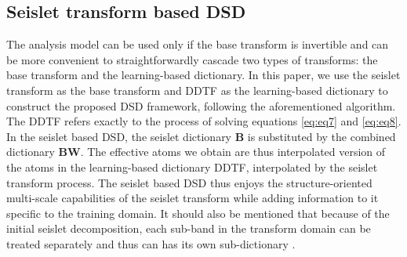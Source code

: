 \subsection{Seislet transform based DSD}
The analysis model can be used only if the base transform is invertible and can be more convenient to straightforwardly cascade two types of transforms: the base transform and the learning-based dictionary. In this paper, we use the seislet transform \cite[]{fomel2010seislet} as the base transform and DDTF \cite[]{jianfeng2013} as the learning-based dictionary to construct the proposed DSD framework, following 
the aforementioned algorithm. The DDTF refers exactly to the process of solving equations \ref{eq:eq7} and \ref{eq:eq8}. In the seislet based DSD, the seislet dictionary $\mathbf{B}$ is substituted by the combined dictionary $\mathbf{BW}$. The effective atoms we obtain are thus interpolated version of the atoms in the learning-based dictionary DDTF, interpolated by the seislet transform process. The seislet based DSD thus enjoys the structure-oriented multi-scale capabilities of the seislet transform while adding information to it specific to the training domain. It should also be mentioned that because of the initial seislet decomposition, each sub-band in the transform domain can be treated separately and thus can has its own sub-dictionary \cite[]{ophir2011}.

